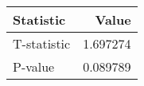 \begin{tabular}{lr}
\toprule
Statistic & Value \\
\midrule
T-statistic & 1.697274 \\
P-value & 0.089789 \\
\bottomrule
\end{tabular}
